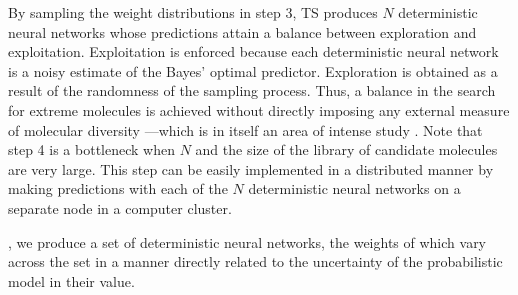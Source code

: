 By sampling the weight distributions in step 3, TS produces $N$ deterministic neural networks whose predictions attain a balance between exploration and exploitation. Exploitation is enforced because each deterministic neural network is a noisy estimate of the Bayes' optimal predictor. Exploration is obtained as a result of the randomness of the sampling process. 
Thus, a balance in the search for extreme molecules is achieved without directly imposing any external measure of molecular diversity ---which is in itself an area of intense study \cite{Maldonado_2006}.
Note that step 4 is a bottleneck when $N$ and the size of the library of candidate molecules are very large.
This step can be easily implemented in a distributed manner by making predictions with each of the $N$ deterministic neural networks on a separate node in a computer cluster.


, we produce a set of deterministic neural networks, the weights of which vary across the set in a manner directly related to the uncertainty of the probabilistic model in their value. 